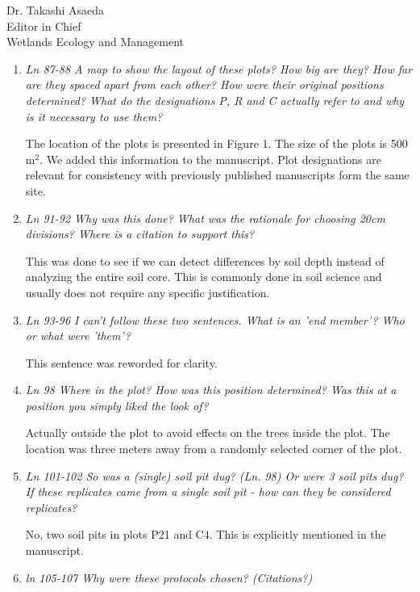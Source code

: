\documentclass[11pt]{bgcletter}
\begin{document}
\begin{letter}{Dr. Takashi Asaeda\\
 Editor in Chief \\ Wetlands Ecology and Management}
\begin{enumerate}
{\color{blue} The diameter and depth were already given in the sentence above. We added a description of the soil corer and information on the random selection of points. We know this is fundamental, and quite obvious, so for this reason we didn't include it in the previous version, but we add it now to address this comment.}

\item {\it Ln 87-88 A map to show the layout of these plots? How big are they? How far are they spaced apart from each other? How were their original positions determined? What do the designations P, R and C actually refer to and why is it necessary to use them?}

{\color{blue} The location of the plots is presented in Figure 1. The size of the plots is 500 m$^2$. We added this information to the manuscript. Plot designations are relevant for consistency with previously published manuscripts form the same site. } 

\item {\it Ln 91-92 Why was this done? What was the rationale for choosing 20cm divisions? Where is a citation to support this?}

{\color{blue} This was done to see if we can detect differences by soil depth instead of analyzing the entire soil core. This is commonly done in soil science and usually does not require any specific justification.}


\item {\it Ln 93-96 I can't follow these two sentences. What is an 'end member'? Who or what were 'them'?}

{\color{blue} This sentence was reworded for clarity.}

\item {\it Ln 98 Where in the plot? How was this position determined? Was this at a position you simply liked the look of?}

{\color{blue} Actually outside the plot to avoid effects on the trees inside the plot. The location was three meters away from a randomly selected corner of the plot. }

\item {\it Ln 101-102 So was a (single) soil pit dug? (Ln. 98) Or were 3 soil pits dug? If these replicates came from a single soil pit - how can they be considered replicates?}

{\color{blue} No, two soil pits in plots P21 and C4. This is explicitly mentioned in the manuscript.}

\item {\it ln 105-107 Why were these protocols chosen? (Citations?)}


\end{enumerate}
\end{letter}
\end{document}
